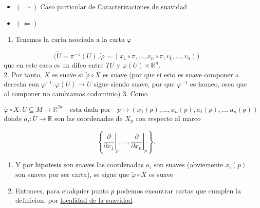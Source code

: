 \begin{bookproof}{}
\begin{itemize}
\item $(\Rightarrow)$ Caso particular de \hyperref[blk:3accf8]{Caracterizaciones de suavidad}
\item $(\Leftarrow)$
\end{itemize}
\begin{enumerate}
\item Tenemos la carta asociada a la carta $\varphi$
\end{enumerate}
\[
\bigg(\widetilde U=\pi^{-1}(U),\tilde\varphi=\left(x_1\circ\pi,\ldots,x_n\circ\pi,v_1,\ldots,v_n\right)\bigg)
\]
que en este caso es un difeo entre $TU$ y $\varphi(U)\times\mathbb{R}^n$.\\
2. Por tanto, $X$ es suave si $\widetilde\varphi\circ X$ es suave (por que si esto es suave componer a derecha con $\varphi ^{-1}:\varphi(U)\rightarrow U$ sigue siendo suave, por que $\varphi ^{-1}$ es homeo, osea que al componer no cambiamos codominio) 3. Como

\[
\widetilde\varphi\circ X:U\subseteq M\longrightarrow\mathbb{R}^{2n}\quad\text{esta dada por}\quad p\longmapsto \left(x_1(p),\ldots,x_n(p),a_1(p),\ldots,a_n(p)\right)
\]
donde $a_i:U\to\mathbb{R}$ son las coordenadas de $X_{p}$ con respecto al marco

\[
\left\{\left.\frac{\partial}{\partial x_1}\right|_p,\ldots,\left.\frac{\partial}{\partial x_n}\right|_p\right\},
\]
\begin{enumerate}[start=4]
\item Y por hipotesis son suaves las coordenadas $a_{i}$ son suaves (obviemente $x_{i}(p)$ son suaves por ser carta), se sigue que $\widetilde\varphi\circ X$ es suave
\item Entonces, para cualquier punto $p$ podemos encontrar cartas que cumplen la definicion, por \hyperref[blk:funcion-suave-entre-variedades]{localidad de la suavidad}.
\end{enumerate}
\bookqed
\end{bookproof}
